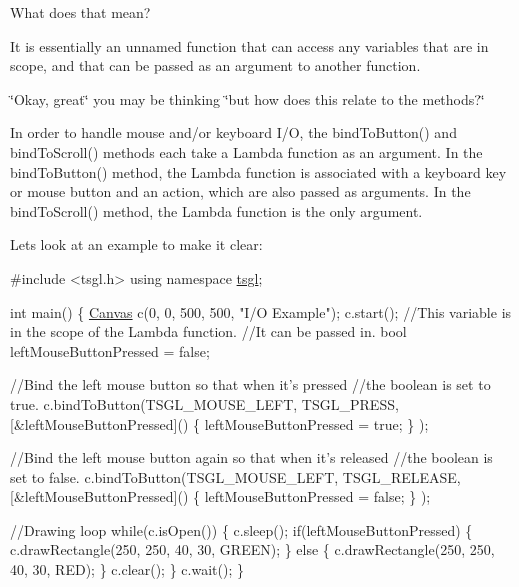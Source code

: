 What does that mean?

It is essentially an unnamed function that can access any variables that are in scope, and that can be passed as an argument to another function.

\char`\"{}\+Okay, great\char`\"{} you may be thinking \char`\"{}but how does this relate to the methods?\char`\"{}

In order to handle mouse and/or keyboard I/\+O, the bind\+To\+Button() and bind\+To\+Scroll() methods each take a Lambda function as an argument. In the bind\+To\+Button() method, the Lambda function is associated with a keyboard key or mouse button and an action, which are also passed as arguments. In the bind\+To\+Scroll() method, the Lambda function is the only argument.

Let\textquotesingle{}s look at an example to make it clear\+:


\begin{DoxyCode}
\textcolor{preprocessor}{#include <tsgl.h>}
\textcolor{keyword}{using namespace }\hyperlink{namespacetsgl}{tsgl};

\textcolor{keywordtype}{int} main() \{
  \hyperlink{classtsgl_1_1_canvas}{Canvas} c(0, 0, 500, 500, \textcolor{stringliteral}{"I/O Example"});
  c.start();
  \textcolor{comment}{//This variable is in the scope of the Lambda function. }
  \textcolor{comment}{//It can be passed in.}
  \textcolor{keywordtype}{bool} leftMouseButtonPressed = \textcolor{keyword}{false};

  \textcolor{comment}{//Bind the left mouse button so that when it's pressed }
  \textcolor{comment}{//the boolean is set to true.}
  c.bindToButton(TSGL\_MOUSE\_LEFT, TSGL\_PRESS, 
                    [&leftMouseButtonPressed]() \{
                          leftMouseButtonPressed = \textcolor{keyword}{true};
                    \}
                );

  \textcolor{comment}{//Bind the left mouse button again so that when it's released }
  \textcolor{comment}{//the boolean is set to false.}
  c.bindToButton(TSGL\_MOUSE\_LEFT, TSGL\_RELEASE, 
                    [&leftMouseButtonPressed]() \{
                          leftMouseButtonPressed = \textcolor{keyword}{false};
                    \}
                );

  \textcolor{comment}{//Drawing loop}
  \textcolor{keywordflow}{while}(c.isOpen()) \{
    c.sleep();
    \textcolor{keywordflow}{if}(leftMouseButtonPressed) \{
      c.drawRectangle(250, 250, 40, 30, GREEN);
    \} \textcolor{keywordflow}{else} \{
      c.drawRectangle(250, 250, 40, 30, RED);
    \}
    c.clear();
  \}
  c.wait();
\}
\end{DoxyCode}



